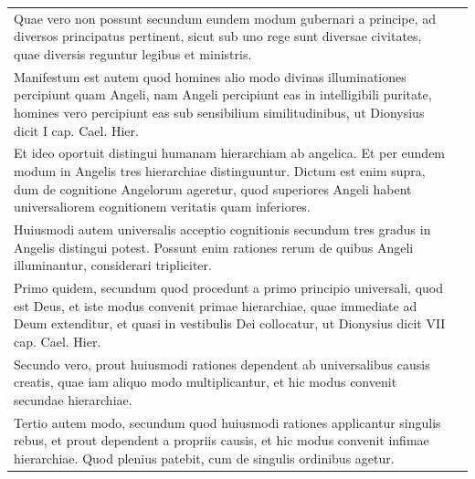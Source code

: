 \documentclass[paper=a4paper,fontsize=10pt,jafontsize=9pt,titlepage]{jlreq}
\begin{document}
\begin{longtable}{p{21em}p{21em}}
Quae vero non possunt secundum eundem modum
gubernari a principe, ad diversos principatus pertinent, sicut sub uno
rege sunt diversae civitates, quae diversis reguntur legibus et
ministris. 


&


\\

Manifestum est autem quod homines alio modo divinas
illuminationes percipiunt quam Angeli, nam Angeli percipiunt eas in
intelligibili puritate, homines vero percipiunt eas sub sensibilium
similitudinibus, ut Dionysius dicit I cap. Cael. Hier. 



&


\\

Et ideo
oportuit distingui humanam hierarchiam ab angelica. Et per eundem
modum in Angelis tres hierarchiae distinguuntur. Dictum est enim
supra, dum de cognitione Angelorum ageretur, quod superiores Angeli
habent universaliorem cognitionem veritatis quam inferiores. 


&


\\


Huiusmodi
autem universalis acceptio cognitionis secundum tres gradus in Angelis
distingui potest. Possunt enim rationes rerum de quibus Angeli
illuminantur, considerari tripliciter. 

&


\\


Primo quidem, secundum quod
procedunt a primo principio universali, quod est Deus, et iste modus
convenit primae hierarchiae, quae immediate ad Deum extenditur, et
quasi in vestibulis Dei collocatur, ut Dionysius dicit VII
cap. Cael. Hier. 


&


\\


Secundo vero, prout huiusmodi rationes dependent ab
universalibus causis creatis, quae iam aliquo modo multiplicantur, et
hic modus convenit secundae hierarchiae. 



&


\\

Tertio autem modo, secundum
quod huiusmodi rationes applicantur singulis rebus, et prout dependent
a propriis causis, et hic modus convenit infimae hierarchiae. Quod
plenius patebit, cum de singulis ordinibus agetur. 




\end{longtable}
\end{document}

